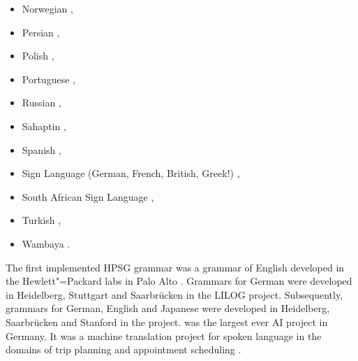 \begin{itemize}
\item Norwegian \citep{HH2004a-u,BH2004a-u,HB2006a-u}, 
\item Persian \citep{MuellerPersian,MG2010a},
\item Polish \citep*{PKMM2002a-u,MMPK2003a-u}, %
\item Portuguese \citep{BC2008a-u,BC2008b-single-quotes,CB2010a-u},
\item Russian \citep{AZ2009a-u}, %
\item Sahaptin \citep{Drellishak2009a-u}, %
\item Spanish
  \citep*{PinedaMeza2005-u,PinedaMeza2005b-u,Bildhauer2008a,Marimon2013a-u%
}, 
\item Sign Language (German, French, British, Greek!) \citep{SM2002a-u,MS2004a-u,SG2010a-u},
\item South African Sign Language \citep{Bungeroth2002a-u},
\item Turkish \citep*{FPB09a-u},
\item Wambaya \citep{Bender2008b-u,Bender2008a,Bender2010a-u}.
\end{itemize}
The first implemented HPSG grammar was a grammar of English developed in the Hewlett"=Packard labs in Palo Alto
\citep*{FPW85a,Flickinger87}. Grammars for German were developed in Heidelberg, Stuttgart and
Saarbrücken in the LILOG project. Subsequently, grammars for German, English and Japanese were
developed in Heidelberg, Saarbrücken and Stanford in the \verbmobil project. \verbmobil was the
largest ever AI project in Germany. It was a machine translation project for spoken language in the
domains of trip planning and appointment scheduling \citep{Wahlster2000a-ed}.

